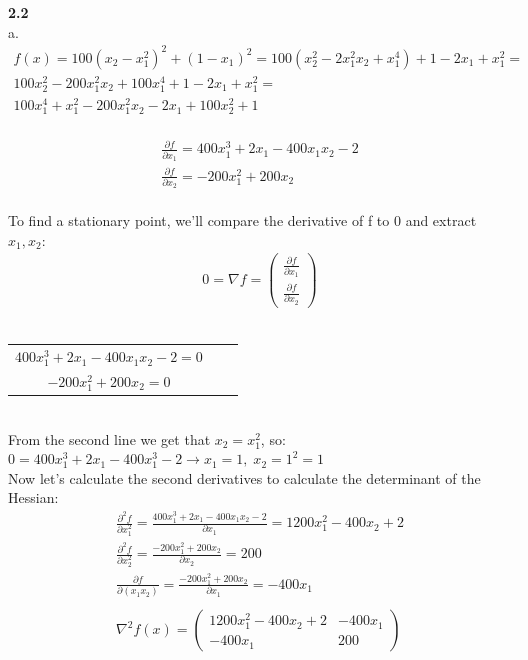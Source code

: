 \documentclass[fleqn]{article}
\begin{document}
\textbf{2.2} \\

a. \\

\begin{align*}
f(x) = 100(x_2-x_1^2)^2+(1-x_1)^2
=
100(x_2^2 - 2x_1^2 x_2 +x_1^4)+1-2x_1 + x_1^2
= \\
100x_2^2 - 200x_1^2 x_2 +100x_1^4+1-2x_1 + x_1^2
= \\
100x_1^4+x_1^2-200x_1^2x_2-2x_1+100x_2^2+1
\end{align*} \\

\begin{align*}
\frac{\partial f }{\partial x_1} = 400x_1^3+2x_1-400x_1x_2 - 2 \\
\frac{\partial f }{\partial x_2} = -200x_1^2+200x_2
\end{align*} \\

To find a stationary point, we'll compare the derivative of f to 0 and extract $x_1,x_2$: \\

\begin{align*}
0=\nabla f= \begin{pmatrix} \frac{\partial f }{\partial x_1} \\ 
							\frac{\partial f }{\partial x_2}
			\end{pmatrix}
\end{align*} \\

\begin{tabular}{ccc}
$400x_1^3+2x_1-400x_1x_2 - 2=0$ &  \\
$-200x_1^2+200x_2=0$ & \\
\end{tabular} \\

From the second line we get that $x_2=x_1^2$, so: \\

$0=400x_1^3+2x_1-400x_1^3 - 2 \rightarrow x_1=1, \; x_2=1^2=1$\\

Now let's calculate the second derivatives to calculate the determinant of the Hessian: \\

\begin{align*}
\frac{\partial ^2 f}{\partial x_1^2}
=
\frac{400x_1^3+2x_1-400x_1x_2 - 2}{\partial x_1}
=
1200x_1^2-400x_2+2 \\
\frac{\partial ^2 f}{\partial x_2^2} = \frac{-200x_1^2+200x_2}{\partial x_2} =200 \\
\frac{\partial f}{\partial (x_1 x_2)} = \frac{-200x_1^2+200x_2}{\partial x_1}=-400x_1 \\ \\
\nabla^2f(x) = \begin{pmatrix}
1200x_1^2-400x_2+2 & -400x_1 \\
-400x_1            & 200
 \end{pmatrix}
\end{align*} \\
\end{document}
